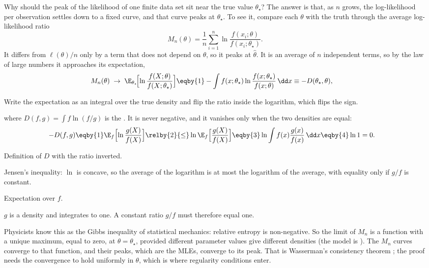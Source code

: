 Why should the peak of the likelihood of one finite data set sit near the
true value $\theta_\star$? The answer is that, as $n$ grows, the
log-likelihood per observation settles down to a fixed curve, and that
curve peaks at $\theta_\star$. To see it, compare each $\theta$ with the
truth through the average log-likelihood ratio
\[
  M_n(\theta)=\frac1n\sum_{i=1}^n\ln\frac{f(x_i;\theta)}{f(x_i;\theta_\star)} .
\]
It differs from $\ell(\theta)/n$ only by a term that does not depend on
$\theta$, so it peaks at $\hat\theta$. It is an average of $n$ independent
terms, so by the law of large numbers it approaches its expectation,
\begin{align}
  M_n(\theta)\;\to\;\E_{\theta_\star}\!\Bigl[\ln\frac{f(X;\theta)}{f(X;\theta_\star)}\Bigr]
  &\eqby{1}-\int f(x;\theta_\star)\ln\frac{f(x;\theta_\star)}{f(x;\theta)}\,\dd x
  \equiv-D(\theta_\star,\theta),
  \label{3b:eq:kl}
\end{align}
\begin{explain}
  \item Write the expectation as an integral over the true density and flip
        the ratio inside the logarithm, which flips the sign.
\end{explain}
where $D(f,g)=\int f\ln(f/g)$ is the 
 . It is never
negative, and it vanishes only when the two densities are equal:
\begin{align*}
  -D(f,g)
  &\eqby{1}\E_f\Bigl[\ln\frac{g(X)}{f(X)}\Bigr]
  \relby{2}{\le}\ln\E_f\Bigl[\frac{g(X)}{f(X)}\Bigr]
  \eqby{3}\ln\int f(x)\frac{g(x)}{f(x)}\,\dd x
  \eqby{4}\ln 1=0 .
\end{align*}
\begin{explain}
  \item Definition of $D$ with the ratio inverted.
  \item Jensen's inequality: $\ln$ is concave, so the average of the
        logarithm is at most the logarithm of the average, with equality only
        if $g/f$ is constant.
  \item Expectation over $f$.
  \item $g$ is a density and integrates to one. A constant ratio $g/f$
        must therefore equal one.
\end{explain}
Physicists know this as the Gibbs inequality of statistical mechanics:
relative entropy is non-negative. So the limit of $M_n$ is a function with a
unique maximum, equal to zero, at $\theta=\theta_\star$, provided different
parameter values give different densities (the model is
). The $M_n$ curves converge to that function, and
their peaks, which are the MLEs, converge to its peak. That is Wasserman's
consistency theorem ; the proof needs the
convergence to hold uniformly in $\theta$, which is where regularity
conditions enter.

